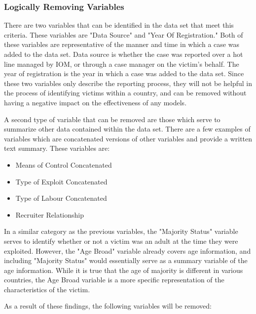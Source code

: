 \documentclass{article} %
\begin{document}
	\subsubsection{Logically Removing Variables}
	 
	
	There are two variables that can be identified in the data set that meet this criteria. These variables are "Data Source" and "Year Of Registration." Both of these variables are representative of the manner and time in which a case was added to the data set. Data source is whether the case was reported over a hot line managed by IOM, or through a case manager on the victim's behalf. The year of registration is the year in which a case was added to the data set. Since these two variables only describe the reporting process, they will not be helpful in the process of identifying victims within a country, and can be removed without having a negative impact on the effectiveness of any models.
	
	A second type of variable that can be removed are those which serve to summarize other data contained within the data set. There are a few examples of variables which are concatenated versions of other variables and provide a written text summary. These variables are:
	
	\begin{multicols}{2}
		\begin{itemize}
			\item Means of Control Concatenated
			\item Type of Exploit Concatenated
			\item Type of Labour Concatenated
			\item Recruiter Relationship
		\end{itemize}
	\end{multicols}
	
	In a similar category as the previous variables, the "Majority Status" variable serves to identify whether or not a victim was an adult at the time they were exploited. However, the "Age Broad" variable already covers age information, and including "Majority Status" would essentially serve as a summary variable of the age information. While it is true that the age of majority is different in various countries, the Age Broad variable is a more specific representation of the characteristics of the victim.
	
	As a result of these findings, the following variables will be removed:
	
\end{document}
